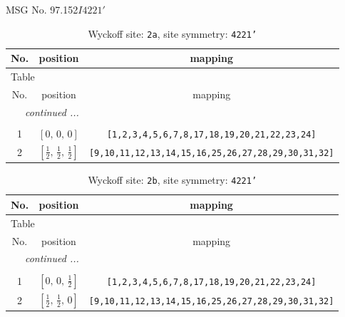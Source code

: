 \documentclass[fleqn,8pt]{jsarticle}
\begin{document}
\setcounter{MaxMatrixCols}{32}

\renewcommand{\tablename}{Table~}
\renewcommand{\figurename}{Figure~}
\begin{center}
\LARGE
MSG No. 97.152\quad$I4221'$
\end{center}
\renewcommand{\arraystretch}{1.2}
\begin{longtable}{ccc}
\caption{Wyckoff site: {\tt 2a}, site symmetry: {\tt 4221'}}
 \\
 \hline \hline
No. & position & mapping \\ \hline \endfirsthead

\multicolumn{2}{l}{\tablename\ \thetable{}} \\
 \hline \hline
No. & position & mapping \\ \hline \endhead

 \hline \hline
\multicolumn{2}{r}{\footnotesize\it continued ...} \\ \endfoot

 \hline \hline
\multicolumn{2}{r}{} \\ \endlastfoot

1 & $\left[ 0,\, 0,\, 0 \right]$ & {\tt [1,2,3,4,5,6,7,8,17,18,19,20,21,22,23,24]} \\ \hline
2 & $\left[ \frac{1}{2},\, \frac{1}{2},\, \frac{1}{2} \right]$ & {\tt [9,10,11,12,13,14,15,16,25,26,27,28,29,30,31,32]} \\
\end{longtable}
\renewcommand{\arraystretch}{1.2}
\begin{longtable}{ccc}
\caption{Wyckoff site: {\tt 2b}, site symmetry: {\tt 4221'}}
 \\
 \hline \hline
No. & position & mapping \\ \hline \endfirsthead

\multicolumn{2}{l}{\tablename\ \thetable{}} \\
 \hline \hline
No. & position & mapping \\ \hline \endhead

 \hline \hline
\multicolumn{2}{r}{\footnotesize\it continued ...} \\ \endfoot

 \hline \hline
\multicolumn{2}{r}{} \\ \endlastfoot

1 & $\left[ 0,\, 0,\, \frac{1}{2} \right]$ & {\tt [1,2,3,4,5,6,7,8,17,18,19,20,21,22,23,24]} \\ \hline
2 & $\left[ \frac{1}{2},\, \frac{1}{2},\, 0 \right]$ & {\tt [9,10,11,12,13,14,15,16,25,26,27,28,29,30,31,32]} \\
\end{longtable}
\end{document}
